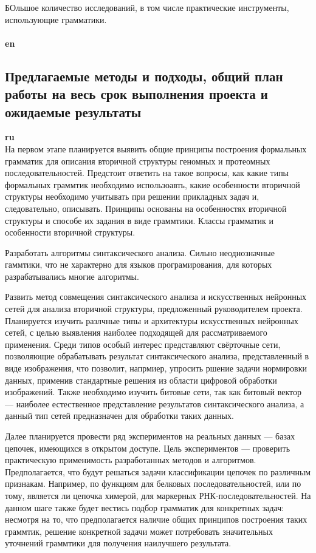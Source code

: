 \documentclass[12pt]{article}  %
\theoremstyle{remark}
\begin{document}
БОльшое количество исследований, в том числе практические инструменты, использующие грамматики.
\\
\\
\textbf{en}\\



\subsection{Предлагаемые методы и подходы, общий план работы на весь срок выполнения проекта и ожидаемые результаты }

\textbf{ru}\\
На первом этапе планируется выявить общие принципы построения формальных грамматик для описания вторичной структуры геномных и протеомных последовательностей. Предстоит ответить на такое вопросы, как какие типы формальных граммтик необходимо использоавть, какие особенности вторичной структуры необходимо учитывать при решении прикладных задач и, следовательно, описывать.
Принципы основаны на особенностях вторичной структуры и способе их задания в виде граммтики.
Классы грамматик и особенности вторичной структуры.

Разработать алгоритмы синтаксического анализа.
Сильно неоднозначные гаммтики, что не характерно для языков програмирования, для которых разрабатывались многие алгоритмы.

Развить метод совмещения синтаксического анализа и искусственных нейронных сетей для анализа вторичной структуры, предложенный руководителем проекта.
Планируется изучить разлчные типы и архитектуры искусственных нейронных сетей, с целью выявления наиболее подходящей для рассматриваемого применения.
Среди типов особый интерес представляют свёрточные сети, позволяющие обрабатывать результат синтаксического анализа, представленный в виде изображения, что позволит, напрмиер, упросить ршение задачи нормировки данных, применив стандартные решения из области цифровой обработки изображений.
Также необходимо изучить битовые сети, так как битовый вектор --- наиболее естественное представление результатов синтаксического анализа, а данный тип сетей предназначен для обработки таких данных.

Далее планируется провести ряд экспериментов на реальных данных --- базах цепочек, имеющихся в открытом доступе.
Цель экспериментов --- проверить практическую применимость разработанных методов и алгоритмов.
Предполагается, что будут решаться задачи классификации цепочек по различным признакам.
Например, по функциям для белковых последовательностей, или по тому, является ли цепочка химерой, для маркерных РНК-последовательностей.
На данном шаге также будет вестись подбор грамматик для конкретных задач: несмотря на то, что предполагается наличие общих принципов построения таких граммтик, решение конкретной задачи может потребовать значительных уточнений граммтики для получения наилучшего результата.
\end{document}
